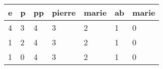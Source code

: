 \documentclass{article}[12pt]
\begin{document}
\centering
\begin{tabular}{lllllll}
e&p&pp&pierre&marie&ab&marie\\
\hline
4&3&4&3&2&1&0\\
1&2&4&3&2&1&0\\
1&0&4&3&2&1&0
\end{tabular}

  
\end{document}
